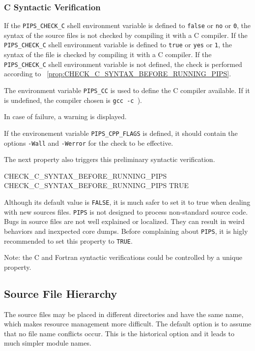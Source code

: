 \documentclass[a4paper]{report}
\newcommand{\PipsPropRef}[1]{\texttt{\detokenize{#1}}~\ref{prop:#1}}
\newcommand{\Pips}{\texttt{PIPS}}
\begin{document}
\subsubsection{C Syntactic Verification}
\label{sec:c-synt-verif}

If the \verb|PIPS_CHECK_C| shell environment variable is defined to
\verb|false| or \verb|no| or \verb|0|, the syntax of the source files
is not checked by compiling it with a C compiler. If the
\verb|PIPS_CHECK_C| shell environment variable is defined to
\verb|true| or \verb|yes| or \verb|1|, the syntax of the file is
checked by compiling it with a C compiler. If the
\verb|PIPS_CHECK_C| shell environment variable is not defined, the
check is performed according to \PipsPropRef{CHECK_C_SYNTAX_BEFORE_RUNNING_PIPS}.

The environment variable
\verb|PIPS_CC| is used to define the C compiler available. If it is undefined, the
compiler chosen is \verb|gcc -c |).

In case of failure, a warning is displayed.

If the environement variable \verb|PIPS_CPP_FLAGS| is defined, it
should contain the options \verb|-Wall| and \verb|-Werror| for the
check to be effective.

The next property also triggers this preliminary syntactic verification.

\begin{PipsProp}{CHECK_C_SYNTAX_BEFORE_RUNNING_PIPS}
CHECK_C_SYNTAX_BEFORE_RUNNING_PIPS TRUE
\end{PipsProp}

Although its default value is \verb|FALSE|, it is much safer to set it
to true when dealing with new sources files. \Pips{} is not designed to
process non-standard source code. Bugs in source files are not well
explained or localized. They can result in weird behaviors and
inexpected core dumps. Before complaining about \Pips{}, it is higly
recommended to set this property to \verb|TRUE|. 

Note: the C and Fortran syntactic verifications could be controlled by
a unique property.

\subsection{Source File Hierarchy}
\label{sec:source-file-hierarchy}

The source files may be placed in different directories and have the
same name, which makes resource management more difficult. The default
option is to assume that no file name conflicts occur. This is the
historical option and it leads to much simpler module names.
\end{document}
